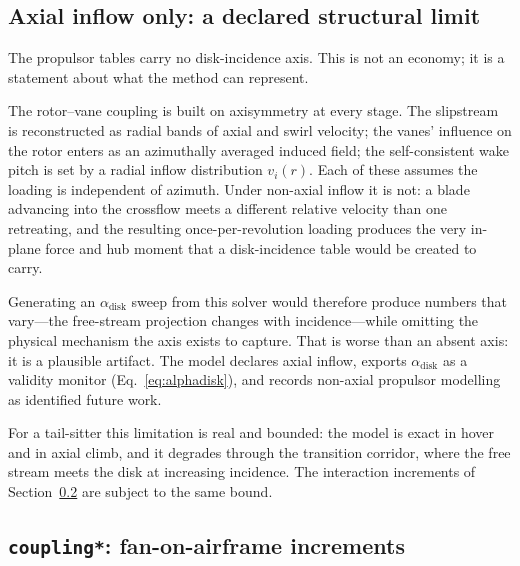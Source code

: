 \documentclass[11pt,a4paper]{article}
\newcommand{\varid}[1]{\texttt{\small #1}}
\begin{document}
\subsection{Axial inflow only: a declared structural limit}
\label{sec:axialonly}

The propulsor tables carry no disk-incidence axis. This is not an
economy; it is a statement about what the method can represent.

The rotor--vane coupling is built on axisymmetry at every stage. The
slipstream is reconstructed as radial bands of axial and swirl velocity;
the vanes' influence on the rotor enters as an azimuthally averaged
induced field; the self-consistent wake pitch is set by a radial inflow
distribution $v_i(r)$. Each of these assumes the loading is independent
of azimuth. Under non-axial inflow it is not: a blade advancing into the
crossflow meets a different relative velocity than one retreating, and
the resulting once-per-revolution loading produces the very in-plane
force and hub moment that a disk-incidence table would be created to
carry.

Generating an $\alpha_{\mathrm{disk}}$ sweep from this solver would
therefore produce numbers that vary---the free-stream projection changes
with incidence---while omitting the physical mechanism the axis exists to
capture. That is worse than an absent axis: it is a plausible artifact.
The model declares axial inflow, exports $\alpha_{\mathrm{disk}}$ as a
validity monitor (Eq.~\ref{eq:alphadisk}), and records non-axial
propulsor modelling as identified future work.

For a tail-sitter this limitation is real and bounded: the model is exact
in hover and in axial climb, and it degrades through the transition
corridor, where the free stream meets the disk at increasing incidence.
The interaction increments of Section~\ref{sec:coupling} are subject to
the same bound.

\subsection{\varid{coupling*}: fan-on-airframe increments}
\label{sec:coupling}
\end{document}
